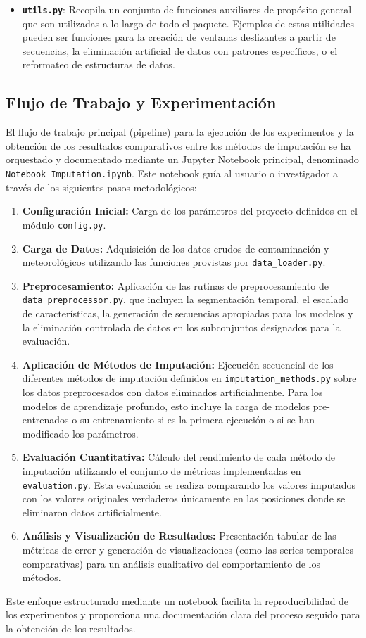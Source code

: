 \begin{itemize}
    \item \textbf{\texttt{utils.py}}: Recopila un conjunto de funciones auxiliares de propósito general que son utilizadas a lo largo de todo el paquete. Ejemplos de estas utilidades pueden ser funciones para la creación de ventanas deslizantes a partir de secuencias, la eliminación artificial de datos con patrones específicos, o el reformateo de estructuras de datos.
\end{itemize}

\subsection{Flujo de Trabajo y Experimentación}
El flujo de trabajo principal (pipeline) para la ejecución de los experimentos y la obtención de los resultados comparativos entre los métodos de imputación se ha orquestado y documentado mediante un Jupyter Notebook principal, denominado \texttt{Notebook\_Imputation.ipynb}. Este notebook guía al usuario o investigador a través de los siguientes pasos metodológicos:
\begin{enumerate}
    \item \textbf{Configuración Inicial:} Carga de los parámetros del proyecto definidos en el módulo \texttt{config.py}.
    \item \textbf{Carga de Datos:} Adquisición de los datos crudos de contaminación y meteorológicos utilizando las funciones provistas por \texttt{data\_loader.py}.
    \item \textbf{Preprocesamiento:} Aplicación de las rutinas de preprocesamiento de \texttt{data\_preprocessor.py}, que incluyen la segmentación temporal, el escalado de características, la generación de secuencias apropiadas para los modelos y la eliminación controlada de datos en los subconjuntos designados para la evaluación.
    \item \textbf{Aplicación de Métodos de Imputación:} Ejecución secuencial de los diferentes métodos de imputación definidos en \texttt{imputation\_methods.py} sobre los datos preprocesados con datos eliminados artificialmente. Para los modelos de aprendizaje profundo, esto incluye la carga de modelos pre-entrenados o su entrenamiento si es la primera ejecución o si se han modificado los parámetros.
    \item \textbf{Evaluación Cuantitativa:} Cálculo del rendimiento de cada método de imputación utilizando el conjunto de métricas implementadas en \texttt{evaluation.py}. Esta evaluación se realiza comparando los valores imputados con los valores originales verdaderos únicamente en las posiciones donde se eliminaron datos artificialmente.
    \item \textbf{Análisis y Visualización de Resultados:} Presentación tabular de las métricas de error y generación de visualizaciones (como las series temporales comparativas) para un análisis cualitativo del comportamiento de los métodos.
\end{enumerate}
Este enfoque estructurado mediante un notebook facilita la reproducibilidad de los experimentos y proporciona una documentación clara del proceso seguido para la obtención de los resultados.

